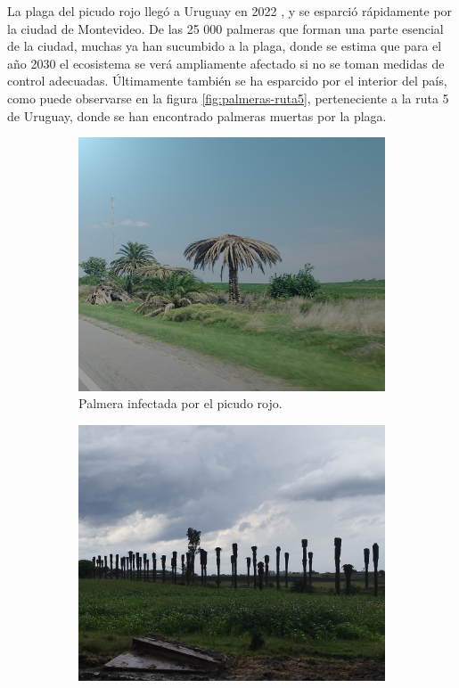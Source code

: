 La plaga del picudo rojo llegó a Uruguay en 2022 \citep{mgap_informacion_nodate}, y se esparció rápidamente por la ciudad de Montevideo. De las 25 000 palmeras que forman una parte esencial de la ciudad, muchas ya han sucumbido a la plaga, donde se estima que para el año 2030 el ecosistema se verá ampliamente afectado \citep{arcos_picudo_2024} si no se toman medidas de control adecuadas. Últimamente también se ha esparcido por el interior del país, como puede observarse en la figura \ref{fig:palmeras-ruta5}, perteneciente a la ruta 5 de Uruguay, donde se han encontrado palmeras muertas por la plaga.

\begin{figure}[htpb]
  \centering
  \begin{subfigure}[b]{0.49\textwidth}
    \centering
    \includegraphics[width=\textwidth]{./Figures/palmera-infectada.jpg}
    \caption{Palmera infectada por el picudo rojo.}
    \label{fig:palmera-infectada}
  \end{subfigure}
  \hfill
  \begin{subfigure}[b]{0.49\textwidth}
    \centering
    \includegraphics[width=.99\textwidth]{./Figures/palmeras-ruta5.jpg}

\end{subfigure}
\end{figure}
